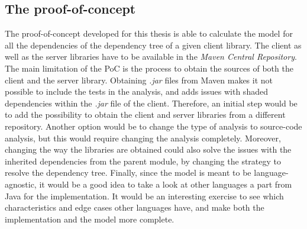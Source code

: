 
\subsection{The proof-of-concept}

The proof-of-concept developed for this thesis is able to calculate the model for all the dependencies of the dependency tree of a given client library. The client as well as the server libraries have to be available in the \textit{Maven Central Repository}. The main limitation of the PoC is the process to obtain the sources of both the client and the server library. Obtaining \textit{.jar} files from Maven makes it not possible to include the tests in the analysis, and adds issues with shaded dependencies within the \textit{.jar} file of the client. Therefore, an initial step would be to add the possibility to obtain the client and server libraries from a different repository. Another option would be to change the type of analysis to source-code analysis, but this would require changing the analysis completely. Moreover, changing the way the libraries are obtained could also solve the issues with the inherited dependencies from the parent module, by changing the strategy to resolve the dependency tree. Finally, since the model is meant to be language-agnostic, it would be a good idea to take a look at other languages a part from Java for the implementation. It would be an interesting exercise to see which characteristics and edge cases other languages have, and make both the implementation and the model more complete.
